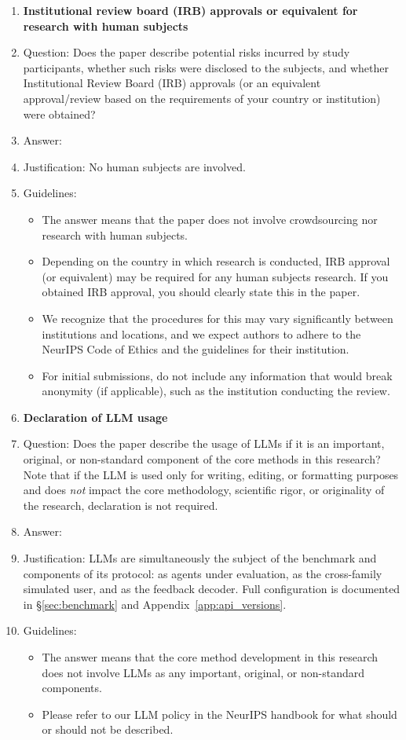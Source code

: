 \documentclass[11pt]{article}
\begin{document}
\begin{enumerate}
\item {\bf Institutional review board (IRB) approvals or equivalent for research with human subjects}
    \item[] Question: Does the paper describe potential risks incurred by study participants, whether such risks were disclosed to the subjects, and whether Institutional Review Board (IRB) approvals (or an equivalent approval/review based on the requirements of your country or institution) were obtained?
    \item[] Answer: \answerNA{}
    \item[] Justification: No human subjects are involved.
    \item[] Guidelines:
    \begin{itemize}
        \item The answer \answerNA{} means that the paper does not involve crowdsourcing nor research with human subjects.
        \item Depending on the country in which research is conducted, IRB approval (or equivalent) may be required for any human subjects research. If you obtained IRB approval, you should clearly state this in the paper.
        \item We recognize that the procedures for this may vary significantly between institutions and locations, and we expect authors to adhere to the NeurIPS Code of Ethics and the guidelines for their institution.
        \item For initial submissions, do not include any information that would break anonymity (if applicable), such as the institution conducting the review.
    \end{itemize}

\item {\bf Declaration of LLM usage}
    \item[] Question: Does the paper describe the usage of LLMs if it is an important, original, or non-standard component of the core methods in this research? Note that if the LLM is used only for writing, editing, or formatting purposes and does \emph{not} impact the core methodology, scientific rigor, or originality of the research, declaration is not required.
    \item[] Answer: \answerYes{}
    \item[] Justification: LLMs are simultaneously the subject of the benchmark and components of its protocol: as agents under evaluation, as the cross-family simulated user, and as the feedback decoder. Full configuration is documented in \S\ref{sec:benchmark} and Appendix~\ref{app:api_versions}.
    \item[] Guidelines:
    \begin{itemize}
        \item The answer \answerNA{} means that the core method development in this research does not involve LLMs as any important, original, or non-standard components.
        \item Please refer to our LLM policy in the NeurIPS handbook for what should or should not be described.
    \end{itemize}

\end{enumerate}
\end{document}
